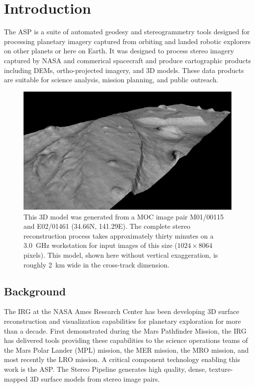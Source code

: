 \chapter{Introduction}

\acresetall

The  \ac{ASP} is a suite of automated geodesy and
stereogrammetry tools designed for processing planetary imagery
captured from orbiting and landed robotic explorers on other planets
or here on Earth.  It was designed to process stereo imagery captured
by \ac{NASA} and commerical spacecraft and produce cartographic
products including \acp{DEM}, ortho-projected imagery, and 3D models.
These data products are suitable for science analysis, mission
planning, and public outreach.

\begin{figure}[tb]
   \centering
   \includegraphics[width=6.5in]{images/introduction/p19view2.png}
   \caption{This 3D model was generated from a \acf{MOC} image
     pair M01/00115 and E02/01461 (34.66N, 141.29E).  The complete
     stereo reconstruction process takes approximately thirty minutes on
     a 3.0~GHz workstation for input images of this size ($1024 \times 8064$
     pixels).  This model, shown here without vertical
     exaggeration, is roughly 2~km wide in the cross-track
     dimension. }
   \label{fig:p19}
\end{figure}

\section{Background}

The \ac{IRG} at the NASA Ames Research Center has been developing
3D surface reconstruction and visualization capabilities for planetary
exploration for more than a decade.  First demonstrated during the
Mars Pathfinder Mission, the \ac{IRG} has delivered tools providing
these capabilities to the science operations teams of the Mars Polar
Lander (MPL) mission, the \ac{MER} mission, the \ac{MRO} mission,
and most recently the \ac{LRO} mission. A critical component
technology enabling this work is the \acf{ASP}.  The Stereo Pipeline
generates high quality, dense, texture-mapped 3D surface models
from stereo image pairs.

